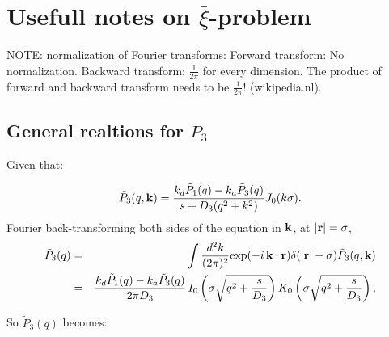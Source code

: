 \documentclass[a4paper,10pt]{article}
\begin{document}
\section{Usefull notes on $\bar{\xi}$-problem}

NOTE: normalization of Fourier transforms: Forward transform: No normalization. Backward transform: $\frac{1}{2 \pi}$ for every dimension. The product of forward and backward transform needs to be $\frac{1}{2 \pi}$! (wikipedia.nl).

\subsection{General realtions for $P_3$}

Given that:

\begin{equation}
 \tilde{P}_3(q,{\bf k}) = \frac{k_d \tilde{P}_1(q) - k_a\tilde{P}_3(q)}{s + D_3(q^2 + k^2)} J_{0}(k \sigma ).
\end{equation}
Fourier back-transforming both sides of the equation in ${\bf k}$, at $|{\bf r}|=\sigma$,
\begin{eqnarray}
 \tilde{P}_3(q) & = & \int \frac{d^2 k}{(2 \pi)^2} {\rm exp}(-i\,{\bf k}\cdot{\bf r}) \delta(|{\bf r}|-\sigma) \tilde{P}_3(q,{\bf k}) \\
 & = & \frac{k_d \tilde{P}_1(q) - k_a\tilde{P}_3(q)}{2 \pi D_3} \, I_{0}\left( \sigma \sqrt{q^2 + \frac{s}{D_3}} \right) K_{0}\left( \sigma \sqrt{q^2 + \frac{s}{D_3}} \right),
\end{eqnarray}

So $\tilde{P}_3(q)$ becomes:
\end{document}

